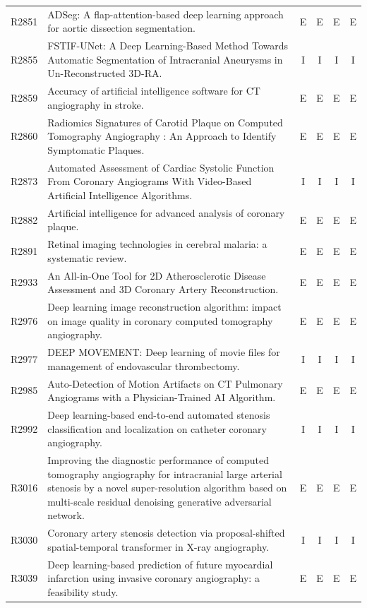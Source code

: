 \begin{longtable}{@{}l p{8.6cm} c c c c@{}}
R2851 & ADSeg: A flap-attention-based deep learning approach for aortic dissection segmentation. & E & E & E & E \\
R2855 & FSTIF-UNet: A Deep Learning-Based Method Towards Automatic Segmentation of Intracranial Aneurysms in Un-Reconstructed 3D-RA. & I & I & I & I \\
R2859 & Accuracy of artificial intelligence software for CT angiography in stroke. & E & E & E & E \\
R2860 & Radiomics Signatures of Carotid Plaque on Computed Tomography Angiography : An Approach to Identify Symptomatic Plaques. & E & E & E & E \\
R2873 & Automated Assessment of Cardiac Systolic Function From Coronary Angiograms With Video-Based Artificial Intelligence Algorithms. & I & I & I & I \\
R2882 & Artificial intelligence for advanced analysis of coronary plaque. & E & E & E & E \\
R2891 & Retinal imaging technologies in cerebral malaria: a systematic review. & E & E & E & E \\
R2933 & An All-in-One Tool for 2D Atherosclerotic Disease Assessment and 3D Coronary Artery Reconstruction. & E & E & E & E \\
R2976 & Deep learning image reconstruction algorithm: impact on image quality in coronary computed tomography angiography. & E & E & E & E \\
R2977 & DEEP MOVEMENT: Deep learning of movie files for management of endovascular thrombectomy. & I & I & I & I \\
R2985 & Auto-Detection of Motion Artifacts on CT Pulmonary Angiograms with a Physician-Trained AI Algorithm. & E & E & E & E \\
R2992 & Deep learning-based end-to-end automated stenosis classification and localization on catheter coronary angiography. & I & I & I & I \\
R3016 & Improving the diagnostic performance of computed tomography angiography for intracranial large arterial stenosis by a novel super-resolution algorithm based on multi-scale residual denoising generative adversarial network. & E & E & E & E \\
R3030 & Coronary artery stenosis detection via proposal-shifted spatial-temporal transformer in X-ray angiography. & I & I & I & I \\
R3039 & Deep learning-based prediction of future myocardial infarction using invasive coronary angiography: a feasibility study. & E & E & E & E \\

\end{longtable}
